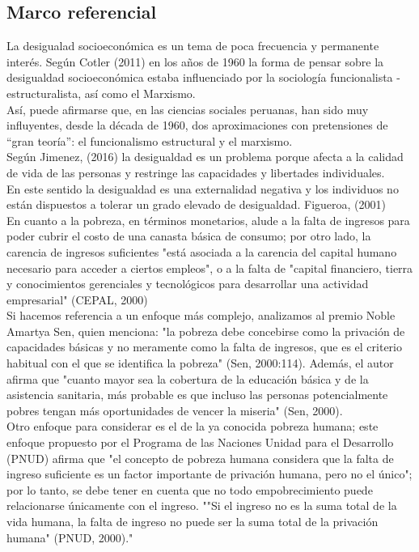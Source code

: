 \subsection{Marco referencial}
	
La desigualad socioeconómica es un tema de poca frecuencia y permanente interés. 
Según Cotler (2011) en los años de 1960 la forma de pensar sobre la desigualdad socioeconómica estaba influenciado por la sociología funcionalista - estructuralista, así como el Marxismo. \\
Así, puede afirmarse que, en las ciencias sociales peruanas, han sido muy influyentes, desde la década de 1960, dos aproximaciones con pretensiones de “gran teoría”: el funcionalismo estructural y el marxismo. \\
Según Jimenez, (2016) la desigualdad es un problema porque afecta a la calidad de vida de las personas y restringe las capacidades y libertades individuales.\\
En este sentido la desigualdad es una externalidad negativa y los individuos no están dispuestos a tolerar un grado elevado de desigualdad. Figueroa, (2001)\\
En cuanto a la pobreza, en términos monetarios, alude a la falta de ingresos para poder cubrir el costo de una canasta básica de consumo; por otro lado, la carencia de ingresos suficientes "está asociada a la carencia del capital humano necesario para acceder a ciertos empleos", o a la falta de "capital financiero, tierra y conocimientos gerenciales y tecnológicos para desarrollar una actividad empresarial" (CEPAL, 2000) \\
Si hacemos referencia a un enfoque más complejo, analizamos al premio Noble Amartya Sen, quien menciona: "la pobreza debe concebirse como la privación de capacidades básicas y no meramente como la falta de ingresos, que es el criterio habitual con el que se identifica la pobreza" (Sen, 2000:114).  Además, el autor afirma que "cuanto mayor sea la cobertura de la educación básica y de la asistencia sanitaria, más probable es que incluso las personas potencialmente pobres tengan más oportunidades de vencer la miseria" (Sen, 2000).\\
Otro enfoque para considerar es el de la ya conocida pobreza humana; este enfoque propuesto por el Programa de las Naciones Unidad para el Desarrollo (PNUD) afirma que "el concepto de pobreza humana considera que la falta de ingreso suficiente es un factor importante de privación humana, pero no el único"; por lo tanto, se debe tener en cuenta que no todo empobrecimiento puede relacionarse únicamente con el ingreso. ""Si el ingreso no es la suma total de la vida humana, la falta de ingreso no puede ser la suma total de la privación humana" (PNUD, 2000)."\\
